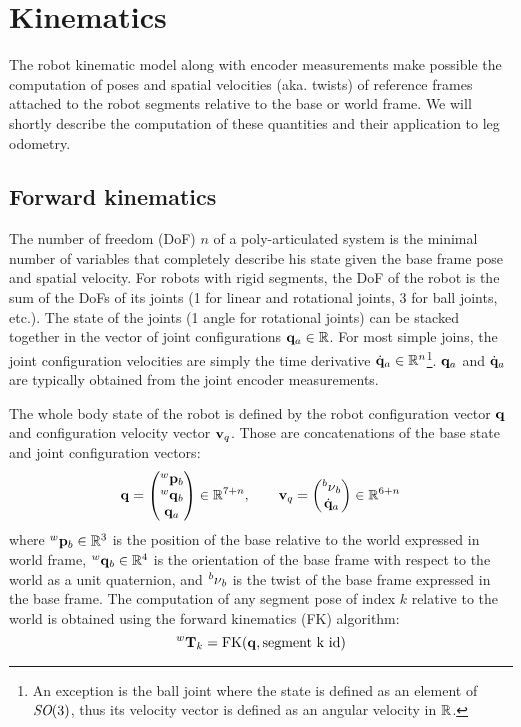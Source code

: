 \chapter{Kinematics}
\minitoc

The robot kinematic model along with encoder measurements make possible the computation of poses and spatial velocities \cite{featherstone2014rigid} (aka. twists) 
of reference frames attached to the robot segments relative to the base or world frame. We will shortly describe the computation of these quantities and their 
application to leg odometry.


\section{Forward kinematics}
The number of freedom (DoF) $n$ of a poly-articulated system is the minimal number of variables that completely describe his state given the base frame
pose and spatial velocity. For robots with rigid segments, the DoF of the robot is the sum of the DoFs of its joints (1 for linear and rotational joints, 3 for
ball joints, etc.). The state of the joints (1 angle for rotational joints) can be stacked together in the vector of joint configurations 
${\bf q}_a \in \mathbb{R}$. For most simple joins, the joint configuration velocities are simply the time derivative $\dot{{\bf q}}_a \in \mathbb{R}^n$\footnote{An exception is the ball joint where the 
state is defined as an element of $\textit{SO}(3)$, thus its velocity vector is defined as an angular velocity in $\mathbb{R}$.}. ${\bf q}_a$ and $\dot{{\bf q}}_a$ are typically obtained from
the joint encoder measurements.

The whole body state of the robot is defined by the robot configuration vector ${\bf q}$ and configuration velocity vector ${\bf v}_q$. Those are concatenations
of the base state and joint configuration vectors:
%
\begin{equation}
    {\bf q}=
    \begin{pmatrix}
        \prescript{w}{}{{\bf p}}_{b} \\
        \prescript{w}{}{{\bf q}}_b \\
        {\bf q}_a
    \end{pmatrix} \in \mathbb{R}^{7+n},
    \quad \quad
    {\bf v}_q=
    \begin{pmatrix}
        \prescript{b}{}{\mathbf{\nu}}_b  \\
        \dot{{\bf q}}_a
    \end{pmatrix}
    \label{eq:configuration} \in \mathbb{R}^{6+n}
\end{equation}
%
where $\prescript{w}{}{{\bf p}}_{b} \in \mathbb{R}^3$ is the position of the base relative to the world expressed in world frame, $\prescript{w}{}{{\bf q}}_b \in \mathbb{R}^4$ is the orientation 
of the base frame with respect to the world as a unit quaternion, and $\prescript{b}{}{\mathbf{\nu}}_b$ is the twist of the base frame expressed in the base frame.
The computation of any segment pose of index $k$ relative to the world is obtained using the forward kinematics (FK) algorithm:
%
\begin{equation}
    \prescript{w}{}{{\bf T}}_{k} = \text{FK}({\bf q}, \text{segment k id})
\end{equation}

